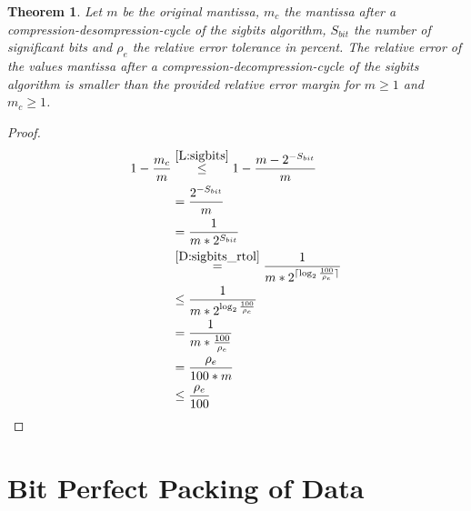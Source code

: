 \documentclass[
	12pt,
	a4paper,
	BCOR10mm,
	DIV14,
	headsepline,
]{scrreprt}
\newtheorem{theorem}{Theorem}
\DeclarePairedDelimiter{\ceil}{\lceil}{\rceil}
\begin{document}
\clearpage

\begin{theorem} \label{T:sigbits}
	Let $m$ be the original mantissa, $m_c$ the mantissa after a
	compression-desompression-cycle of the sigbits algorithm, $S_{bit}$ the
	number of significant bits and $\rho_e$ the relative error tolerance in
	percent. The relative error of the values mantissa after a
	compression-decompression-cycle of the sigbits algorithm is smaller than
	the provided relative error margin for $m\ge 1$ and $m_c\ge 1$.
\end{theorem}

\begin{proof}
	\begingroup
	\addtolength{\jot}{1em}
	\begin{align*}
		1 - \frac{m_c}{m}
		&\stackrel{\ref{L:sigbits}}{\le}1 - \frac{m-2^{-S_{bit}}}{m} \\
	  	&=\frac{2^{-S_{bit}}}{m} \\
		&=\frac{1}{m * 2^{S_{bit}}} \\
	  	&\stackrel{\ref{D:sigbits_rtol}}{=}\frac{1}{m * 2^{
				\ceil{
					\log_2{\frac{100}{\rho_{e}}}
				}
			}} \\
	  	&\le \frac{1}{m * 2^{
				\log_2{\frac{100}{\rho_{e}}}
			}} \\
	  	&=\frac{1}{m * \frac{100}{\rho_{e}}} \\
		&=\frac{\rho_e}{100 * m} \\
	  	&\le \frac{\rho_e}{100} \qedhere
	\end{align*}
	\endgroup
\end{proof}

\chapter{Bit Perfect Packing of Data}
\label{bit_perf}
\end{document}
